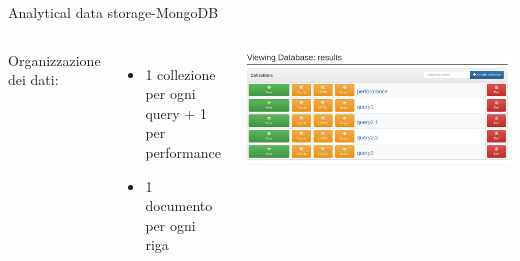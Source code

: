 \documentclass[13pt,aspectratio=169,t,xcolor=table]{beamer}
\begin{document}
\begin{frame}{Analytical data storage-MongoDB}
    \vspace{0.5cm}
    \begin{columns}
            \begin{minipage}[b]{1\textwidth}
                Organizzazione dei dati:
                \begin{itemize}
                    \item 1 collezione per ogni query + 1 per performance
                    \item 1 documento per ogni riga
                \end{itemize}
            \end{minipage}
            \begin{minipage}{1\textwidth}
                \begin{adjustbox}{margin=0cm 0cm 1.5cm 0cm, center}
                    \includegraphics[width=1\textwidth]{res/mongo.png}
                \end{adjustbox}
            \end{minipage}
    \end{columns}
\end{frame}
\end{document}
